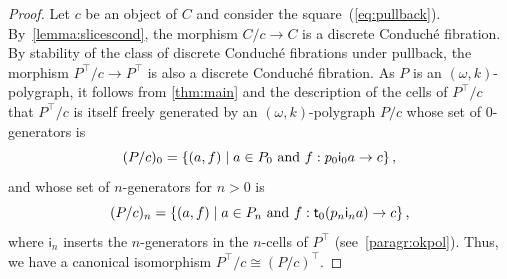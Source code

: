 \documentclass[reqno]{amsart}
\theoremstyle{plain}
\theoremstyle{definition}
\theoremstyle{remark}
\newcommand{\setof}[2]{\left\{ #1\; | \; #2\right\}}
\newcommand{\pair}[2]{(#1,#2)}       %
\newcommand{\target}{\mathsf{t}} %
\newcommand{\geninc}{\mathsf{i}} %
\newcommand{\tr}[2]{#1/#2} %
\newcommand{\tge}[1]{\target_{#1}} %
\newcommand{\frgp}[1]{#1^\top} %
\newcommand{\ook}[1]{\ensuremath{\pair{\omega}{#1}}}
\newcommand{\gni}[1]{\geninc_{#1}}%
\newcommand{\nbd}{\nobreakdash} %
\begin{document}
  \begin{proof}
   Let $c$ be an object of $C$ and consider the
   square~(\ref{eq:pullback}). By~\cref{lemma:slicescond}, the
   morphism $\tr Cc\to C$ is a discrete Conduché fibration. By stability of the class of discrete Conduché fibrations under pullback, the morphism $\tr{\frgp P\!}c\to \frgp
   P$ is also a discrete Conduché fibration. As $P$ is an $\ook
   k$-polygraph, it follows from \cref{thm:main} and the description
   of the cells of $\tr{\frgp P\!}c$
   that $\tr{\frgp P\!}c$ is itself freely generated by an $\ook k$\nbd-polygraph $\tr Pc$ whose set of $0$-generators is
   \[
     (\tr Pc)_0=\setof{\pair{a}{f}}{a\in P_0\ \hbox{and}\  f:p_0\gni 0 a\to c},
   \]
   and whose set of $n$-generators for $n>0$ is
   \[
     (\tr Pc)_n=\setof{\pair{a}{f}}{a\in P_n\ \hbox{and}\  f:\tge 0(p_n\gni n a)\to c},
   \]
   where $\gni n$ inserts the $n$-generators in the $n$-cells of
   $\frgp P$ (see~\ref{paragr:okpol}). Thus, we have a canonical isomorphism
   $\tr{\frgp{P}\!}c\cong \frgp{(\tr Pc)}$.


\end{proof}
\end{document}
